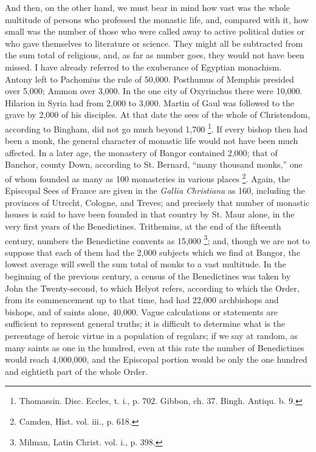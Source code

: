 And then, on the other hand, we must bear in mind how vast was the
whole multitude of persons who professed the monastic life, and,
compared with it, how small was the number of those who were called
away to active political duties or who gave themselves to literature
or science. They might all be subtracted from the sum total of
religious, and, as far as number goes, they would not have been
missed. I have already referred to the exuberance of Egyptian
monachism. Antony left to Pachomius the rule of 50,000. Posthumus of
Memphis presided over 5,000; Ammon over 3,000. In the one city of
Oxyrinchus there were 10,000. Hilarion in Syria had from 2,000 to
3,000. Martin of Gaul was followed to the grave by 2,000 of his
disciples. At that date the sees of the whole of Christendom,
according to Bingham, did not go much beyond 1,700 \footnote{Thomassin.
Disc. Eccles, t. i., p. 702. Gibbon, ch. 37. Bingh. Antiqu. b. 9.}. If every bishop then had been a monk, the general character
of monastic life would not have been much affected. In a later age,
the monastery of Bangor contained 2,000; that of Banchor, county Down,
according to St. Bernard, ``many thousand monks,'' one of whom
founded as many as 100 monasteries in various places \footnote{Camden, Hist.
vol. iii., p. 618.}. Again, the Episcopal Sees of France are given in the \emph{Gallia
Christiana} as 160, including the provinces of Utrecht, Cologne,
and Treves; and precisely that number of monastic houses is said to
have been founded in that country by St. Maur alone, in the very first
years of the Benedictines. Trithemius, at the end of the fifteenth
century, numbers the Benedictine convents as 15,000 \footnote{Milman, Latin
Christ. vol. i., p. 398.}; and, though we are not to suppose that each of them had
the 2,000 subjects which we find at Bangor, the lowest average will
swell the sum total of monks to a vast multitude. In the beginning of
the previous century, a census of the Benedictines was taken by John
the Twenty-second, to which Helyot refers, according to which the
Order, from its commencement up to that time, had had 22,000
archbishops and bishops, and of saints alone, 40,000. Vague
calculations or statements are sufficient to represent general truths;
it is difficult to determine what is the percentage of heroic virtue
in a population of regulars; if we say at random, as many saints as
one in the hundred, even at this rate the number of Benedictines would
reach 4,000,000, and the Episcopal portion would be only the one
hundred and eightieth part of the whole Order.

